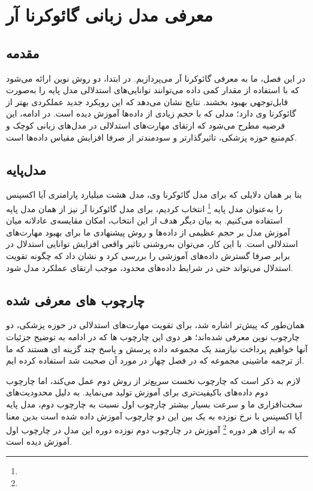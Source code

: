 \chapter{
	معرفی مدل زبانی گائوکرنا آر
}
\section{
مقدمه
}
در این فصل، ما به معرفی گائوکرنا آر می‌پردازیم. در ابتدا، دو روش نوین ارائه می‌شود که با استفاده از مقدار کمی داده می‌توانند توانایی‌های استدلالی مدل پایه را به‌صورت قابل‌توجهی بهبود بخشند. نتایج نشان می‌دهد که این رویکرد جدید عملکردی بهتر از گائوکرنا وی
دارد؛ مدلی که با حجم زیادی از داده‌ها آموزش دیده است. در ادامه، این فرضیه مطرح می‌شود که ارتقای مهارت‌های استدلالی در مدل‌های زبانی کوچک و کم‌منبع حوزه پزشکی، تاثیرگذارتر و سودمندتر از صرفا افزایش مقیاس داده‌ها است.
\section{
‫ﻣﺪل‬‫ﭘﺎﯾﻪ‬
}
بنا بر همان دلایلی که برای مدل گائوکرنا وی، مدل هشت میلیارد پارامتری آیا اکسپنس
\cite{b71}
را به‌عنوان مدل پایه
\footnote{}
انتخاب کردیم، برای مدل گائوکرنا آر نیز از همان مدل پایه استفاده می‌کنیم. به بیان دیگر هدف از این انتخاب، امکان مقایسه‌ی عادلانه میان آموزش مدل بر حجم عظیمی از داده‌ها و روش پیشنهادی ما برای بهبود مهارت‌های استدلالی است. با این کار، می‌توان به‌روشنی تاثیر واقعی افزایش توانایی استدلال در برابر صرفا گسترش داده‌های آموزشی را بررسی کرد و نشان داد که چگونه تقویت استدلال می‌تواند حتی در شرایط داده‌های محدود، موجب ارتقای عملکرد مدل شود.
\section{
چارچوب های معرفی شده
}
همان‌طور که پیش‌تر اشاره شد، برای تقویت مهارت‌های استدلالی در حوزه پزشکی، دو چارچوب نوین معرفی شده‌اند؛ هر دوی این چارچوب ها که در ادامه به توضیح جزئیات آنها خواهیم پرداخت نیازمند یک مجموعه داده پرسش و پاسخ چند گزینه ای هستند که ما از ترجمه ماشینی مجموعه
که در فصل چهار در مورد آن صحبت شد استفاده کرده ایم.

لازم به ذکر است که چارچوب نخست سریع‌تر از روش دوم عمل می‌کند، اما چارچوب دوم داده‌های باکیفیت‌تری برای آموزش تولید می‌نماید. به دلیل محدودیت‌های سخت‌افزاری ما  و سرعت بسیار بیشتر چارچوب اول نسبت به چارچوب دوم، مدل پایه آیا اکسپنس با نرخ نوزده به یک بین این دو چارچوب آموزش داده شده است بدین معنا که به ازای هر دوره
\footnote{}
آموزش در چارچوب دوم نوزده دوره این مدل در چارچوب اول آموزش دیده است.

